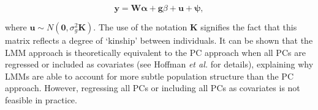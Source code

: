 \begin{equation}\label{eq:Linear_mixed_model}
 \mathbf{y} =  \mathbf{W}\boldsymbol{\alpha} + \mathbf{g}\beta + \mathbf{u} + \boldsymbol{\psi}, 
\end{equation}

where $\mathbf{u} \sim N(\mathbf{0}, \sigma_g^2\mathbf{K})$.
The use of the notation $\mathbf{K}$ signifies the fact that this matrix reflects a degree of `kinship' between individuals. 
It can be shown that the LMM approach is theoretically equivalent to the PC
approach when all PCs are regressed or included as covariates (see Hoffman \textit{et al.} \cite{hoffman2013correcting} for details), explaining why LMMs are able to account for more subtle population structure than the PC approach. 
However, regressing all PCs or including all PCs as covariates is not feasible in practice.













